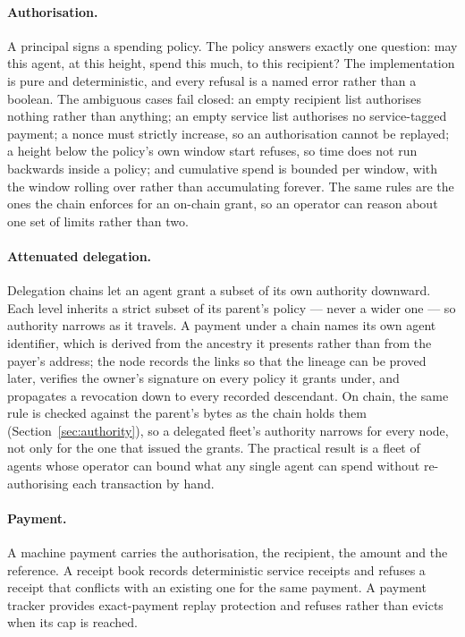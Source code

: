 \documentclass{article}
\begin{document}
\paragraph{Authorisation.} A principal signs a spending policy. The policy
answers exactly one question: may this agent, at this height, spend this much,
to this recipient? The implementation is pure and deterministic, and every
refusal is a named error rather than a boolean. The ambiguous cases fail
closed: an empty recipient list authorises nothing rather than anything; an
empty service list authorises no service-tagged payment; a nonce must strictly
increase, so an authorisation cannot be replayed; a height below the policy's
own window start refuses, so time does not run backwards inside a policy; and
cumulative spend is bounded per window, with the window rolling over rather
than accumulating forever. The same rules are the ones the chain enforces for
an on-chain grant, so an operator can reason about one set of limits rather
than two.

\paragraph{Attenuated delegation.} Delegation chains let an agent grant a
subset of its own authority downward. Each level inherits a strict subset of
its parent's policy --- never a wider one --- so authority narrows as it
travels. A payment under a chain names its own agent identifier, which is
derived from the ancestry it presents rather than from the payer's address;
the node records the links so that the lineage can be proved later, verifies
the owner's signature on every policy it grants under, and propagates a
revocation down to every recorded descendant. On chain, the same rule is
checked against the parent's bytes as the chain holds them
(Section~\ref{sec:authority}), so a delegated fleet's authority narrows for
every node, not only for the one that issued the grants. The practical result
is a fleet of agents whose operator can bound what any single agent can spend
without re-authorising each transaction by hand.

\paragraph{Payment.} A machine payment carries the authorisation, the
recipient, the amount and the reference. A receipt book records deterministic
service receipts and refuses a receipt that conflicts with an existing one for
the same payment. A payment tracker provides exact-payment replay protection
and refuses rather than evicts when its cap is reached.
\end{document}
